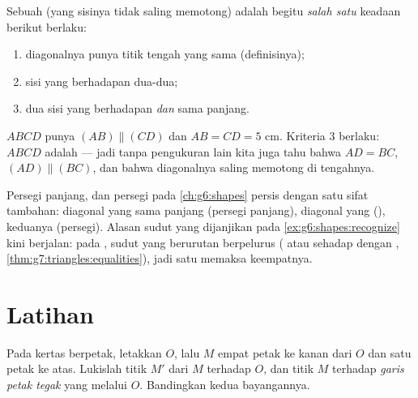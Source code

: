 \begin{theorem}\label{thm:g7:central:recognize}
Sebuah  (yang sisinya tidak saling memotong) adalah
 begitu \emph{salah satu} keadaan berikut berlaku:
\begin{enumerate}
  \item diagonalnya punya titik tengah yang sama (definisinya);
  \item sisi yang berhadapan  dua-dua;
  \item dua sisi yang berhadapan  \emph{dan} sama panjang.
\end{enumerate}
\end{theorem}
\admitted

\begin{example}\label{ex:g7:central:recognize}
$ABCD$ punya $(AB) \parallel (CD)$ dan $AB = CD = 5$ cm. Kriteria 3
berlaku: $ABCD$ adalah  --- jadi tanpa pengukuran lain
kita juga tahu bahwa $AD = BC$, $(AD) \parallel (BC)$, dan bahwa
diagonalnya saling memotong di tengahnya.
\end{example}

\begin{remark}
Persegi panjang,  dan persegi pada \cref{ch:g6:shapes}
persis  dengan satu sifat tambahan: diagonal yang sama
panjang (persegi panjang), diagonal yang  (),
keduanya (persegi). Alasan sudut yang dijanjikan pada
\cref{ex:g6:shapes:recognize} kini berjalan: pada , sudut
yang berurutan berpelurus ( atau sehadap dengan
, \cref{thm:g7:triangles:equalities}), jadi satu  memaksa keempatnya.
\end{remark}

\section{Latihan}

\begin{exercise}[$\star$]\label{exo:g7:central:1}
Pada kertas berpetak, letakkan $O$, lalu $M$ empat petak ke kanan dari
$O$ dan satu petak ke atas. Lukislah titik  $M'$ dari $M$
terhadap $O$, dan titik  $M$ terhadap \emph{garis petak tegak}
yang melalui $O$. Bandingkan kedua bayangannya.
\end{exercise}

